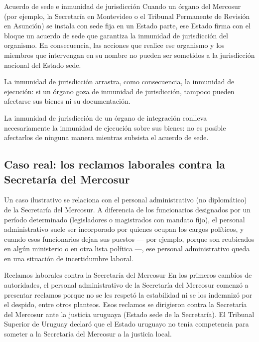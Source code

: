 \documentclass[12pt,oneside]{book}
\begin{document}
\begin{definition}{Acuerdo de sede e inmunidad de jurisdicción}
Cuando un órgano del Mercosur (por ejemplo, la Secretaría en Montevideo o el Tribunal Permanente de Revisión en Asunción) se instala con sede fija en un Estado parte, ese Estado firma con el bloque un acuerdo de sede que garantiza la inmunidad de jurisdicción del organismo. En consecuencia, las acciones que realice ese organismo y los miembros que intervengan en su nombre no pueden ser sometidos a la jurisdicción nacional del Estado sede.
\end{definition}

La inmunidad de jurisdicción arrastra, como consecuencia, la inmunidad de ejecución: si un órgano goza de inmunidad de jurisdicción, tampoco pueden afectarse sus bienes ni su documentación.

\begin{important}
La inmunidad de jurisdicción de un órgano de integración conlleva necesariamente la inmunidad de ejecución sobre sus bienes: no es posible afectarlos de ninguna manera mientras subsista el acuerdo de sede.
\end{important}

\subsection{Caso real: los reclamos laborales contra la Secretaría del Mercosur}

Un caso ilustrativo se relaciona con el personal administrativo (no diplomático) de la Secretaría del Mercosur. A diferencia de los funcionarios designados por un período determinado (legisladores o magistrados con mandato fijo), el personal administrativo suele ser incorporado por quienes ocupan los cargos políticos, y cuando esos funcionarios dejan sus puestos --- por ejemplo, porque son reubicados en algún ministerio o en otra lista política ---, ese personal administrativo queda en una situación de incertidumbre laboral.

\begin{example}{Reclamos laborales contra la Secretaría del Mercosur}
En los primeros cambios de autoridades, el personal administrativo de la Secretaría del Mercosur comenzó a presentar reclamos porque no se les respetó la estabilidad ni se los indemnizó por el despido, entre otros planteos. Esos reclamos se dirigieron contra la Secretaría del Mercosur ante la justicia uruguaya (Estado sede de la Secretaría). El Tribunal Superior de Uruguay declaró que el Estado uruguayo no tenía competencia para someter a la Secretaría del Mercosur a la justicia local.
\end{example}
\end{document}
